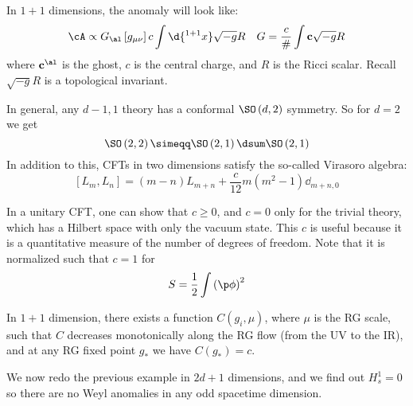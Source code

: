 \documentclass{booc}
\begin{document}
\begin{exm}
In $1 + 1$ dimensions, the anomaly will look like:
\begin{align}
\cA \propto G_\al\left[ g_{\mu\nu} \right] c\int \d{^{1+1}x} \sqrt{-g} R
&&
G = \frac{c}{\#} \int \mathbf{c} \sqrt{-g} R
\end{align}
where $\mathbf{c}^\al$ is the ghost, $c$ is the central charge, and $R$ is the Ricci scalar. 
Recall $\sqrt{-g}R$ is a topological invariant. 

In general, any $d - 1 , 1$ theory has a conformal $\SO\left( d , 2 \right)$ symmetry.
So for $d = 2$ we get 
\begin{equation}
\SO\left( 2 , 2 \right) \simeqq \SO\left( 2 , 1 \right) \dsum \SO\left( 2 , 1 \right)
\end{equation}
In addition to this, CFTs in two dimensions satisfy the so-called Virasoro algebra:
\begin{equation}
\left[ L_m , L_n \right] = 
\left( m-n \right)L_{m+n} + \frac{c}{12}m\left( m^2 - 1 \right)\dd_{m+n , 0}
\end{equation}
\end{exm}

In a unitary CFT, one can show that $c\geq 0$, and $c = 0$ only for the trivial theory, which 
has a Hilbert space with only the vacuum state.
This $c$ is useful because it is a quantitative measure of the number of degrees of freedom.
Note that it is normalized such that $c = 1$ for
\begin{equation}
S = \frac{1}{2} \int \left( \p \phi \right)^2
\end{equation}

\begin{thm}[Zamolodchikov]
In $1+1$ dimension, there exists a function $C\left( g_i , \mu \right)$,
where $\mu$ is the RG scale, such that $C$ decreases monotonically along the RG flow 
(from the UV to the IR), 
and at any RG fixed point $g_*$ we have $C\left( g_* \right) = c$.
\end{thm}

We now redo the previous example in $2d + 1$ dimensions, and we find out $H^1_s = 0$
so there are no Weyl anomalies in any odd spacetime dimension.
\end{document}
